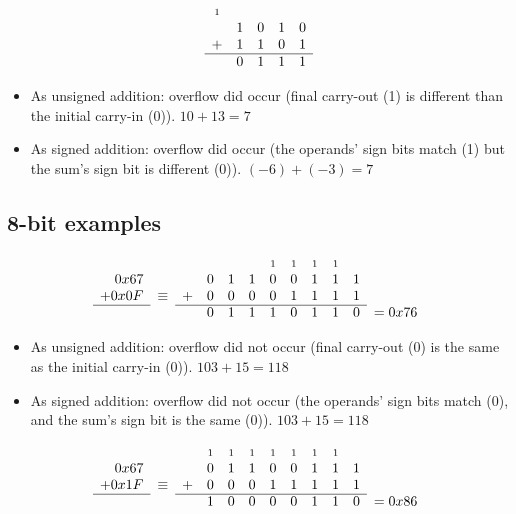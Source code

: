 \documentclass{article}
\newcommand{\carry}{\scriptstyle 1}
\begin{document}
\begin{equation*}\begin{array}{ccccc}
 \carry & & & & \\
  & 1 & 0 & 1 & 0 \\
+ & 1 & 1 & 0 & 1 \\ \hline
  & 0 & 1 & 1 & 1
\end{array}\end{equation*}

\begin{itemize}
\item As unsigned addition: overflow did occur (final carry-out (1) is
    different than the initial carry-in (0)). $10+13=7$
\item As signed addition: overflow did occur (the operands' sign bits match (1)
    but the sum's sign bit is different (0)). $(-6)+(-3)=7$
\end{itemize}

\subsection{8-bit examples}

\begin{equation*}\begin{array}{rccccccccccl}
       &        &   &   &   &   & \carry & \carry & \carry & \carry &  & \\
  0x67 &        &   & 0 & 1 & 1 & 0 & 0 & 1 & 1 & 1 & \\
+ 0x0F & \equiv & + & 0 & 0 & 0 & 0 & 1 & 1 & 1 & 1 & \\ \cline{1-1}\cline{3-11}
       &        &   & 0 & 1 & 1 & 1 & 0 & 1 & 1 & 0 & = 0x76
\end{array}\end{equation*}

\begin{itemize}
\item As unsigned addition: overflow did not occur (final carry-out (0) is the
    same as the initial carry-in (0)). $103+15=118$
\item As signed addition: overflow did not occur (the operands' sign bits
    match (0), and the sum's sign bit is the same (0)). $103+15=118$
\end{itemize}

\begin{equation*}\begin{array}{rccccccccccl}
       &        &   & \carry & \carry & \carry & \carry & \carry & \carry & \carry &  & \\
  0x67 &        &   & 0 & 1 & 1 & 0 & 0 & 1 & 1 & 1 & \\
+ 0x1F & \equiv & + & 0 & 0 & 0 & 1 & 1 & 1 & 1 & 1 & \\ \cline{1-1}\cline{3-11}
       &        &   & 1 & 0 & 0 & 0 & 0 & 1 & 1 & 0 & = 0x86
\end{array}\end{equation*}
\end{document}
